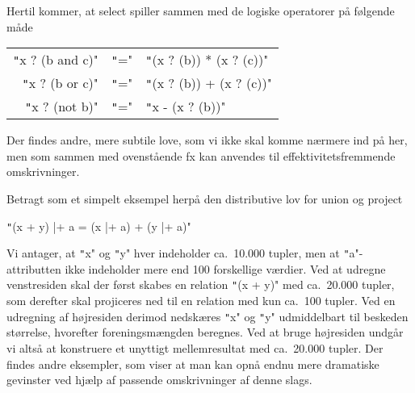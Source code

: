 \documentclass{article}
\newcounter{eks}
\begin{document}
Hertil kommer, at select spiller sammen med de logiske operatorer
p\aa{} f\o{}lgende m\aa{}de
\begin{center}
\begin{tabular}{rcl}
\texttt"x ? (b and c)" & \texttt"=" & \texttt"(x ? (b)) * (x ? (c))"\\
\texttt"x ? (b or c)" & \texttt"=" & \texttt"(x ? (b)) + (x ? (c))"\\
\texttt"x ? (not b)" & \texttt"=" & \texttt"x - (x ? (b))"
\end{tabular}
\end{center}
Der findes andre, mere subtile love, som vi ikke skal komme n\ae{}rmere
ind p\aa{} her, men som sammen med ovenst\aa{}ende fx kan anvendes til
effektivitetsfremmende omskrivninger.

Betragt som et simpelt eksempel herp\aa{} den distributive lov for
union og project
\begin{center}
\texttt"(x + y) |+ a = (x |+ a) + (y |+ a)"
\end{center}
Vi antager, at \texttt"x" og \texttt"y" hver indeholder ca.\ 10.000 tupler,
men at \texttt"a"-attribut\-ten ikke indeholder mere end 100 forskellige
v\ae{}rdier. Ved at udregne venstresiden skal der f\o{}rst skabes en
relation \texttt"(x + y)" med ca.\ 20.000 tupler, som derefter
skal projiceres ned til en relation med kun ca.\ 100 tupler.
Ved en udregning af h\o{}jresiden derimod nedsk\ae{}res \texttt"x" og
\texttt"y" udmiddelbart til beskeden st\o{}rrelse, hvorefter
foreningsm\ae{}ngden beregnes. Ved at bruge h\o{}jresiden undg\aa{}r
vi alts\aa{} at konstruere et unyttigt mellemresultat med ca.\
20.000 tupler. Der findes andre eksempler, som viser at man kan opn\aa{}
endnu mere dramatiske gevinster ved hj\ae{}lp af passende omskrivninger
af denne slags.
\end{document}
